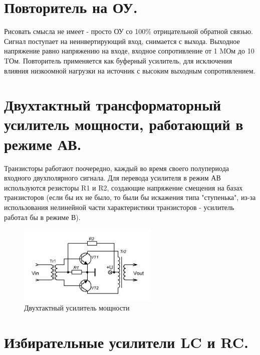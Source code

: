 \documentclass[unicode, 12pt, a4paper, oneside]{article}
\begin{document}
\section{Повторитель на ОУ.}
Рисовать смысла не имеет - просто ОУ со 100\% отрицательной обратной связью. Сигнал поступает на неинвертирующий вход, снимается с выхода. Выходное напряжение равно напряжению на входе, входное сопротивление от 1 MОм до 10 TОм. Повторитель применяется как буферный усилитель, для исключения влияния низкоомной нагрузки на источник с высоким выходным сопротивлением.

\section{Двухтактный трансформаторный усилитель мощности, работающий в режиме АВ.}
Транзисторы работают поочередно, каждый во время своего полупериода входного двухполярного сигнала. Для перевода усилителя в режим АВ используются резисторы R1 и R2, создающие напряжение смещения на базах транзисторов (если бы их не было, то были бы искажения типа "ступенька", из-за использования нелинейной части характеристики транзисторов - усилитель работал бы в режиме В).
\begin{figure}[H]
\centering
\includegraphics[width=0.6\textwidth]{145.jpg}
\caption{Двухтактный усилитель мощности}
\end{figure}

\section{Избирательные усилители LC и RC.}
\end{document}
